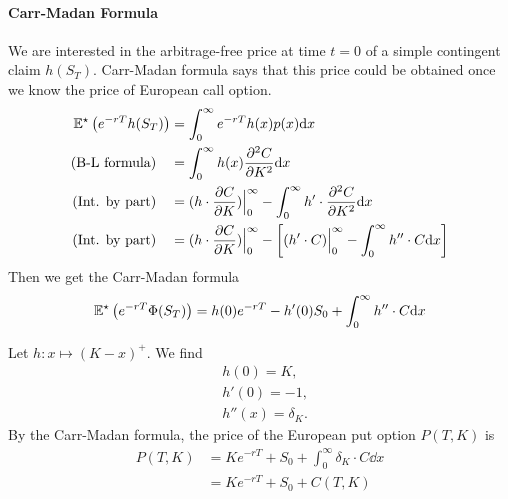 \paragraph{Carr-Madan Formula}  We are interested in the arbitrage-free price at time $t=0$ of a simple contingent claim $h(S_T)$. Carr-Madan formula says that this price could be obtained once we know the price of European call option.   
\begin{align*}
	\mathbb{E}^\star \left(  e^{-rT} h(S_T) \right) &= \int^\infty_0 e^{-rT} h(x) p(x) \mathrm{d} x \\
	(\text{B-L formula})\quad &= \int^\infty_0   h(x) \frac{\partial^2 C}{\partial K^2} \mathrm{d} x \\
	(\text{Int. by part})\quad &= ( h \cdot \frac{\partial C}{\partial K} )\Big|^\infty_0 - \int^\infty_0 h'\cdot \frac{\partial^2 C}{\partial K^2} \mathrm{d} x \\
	 (\text{Int. by part})\quad &=( h \cdot \frac{\partial C}{\partial K} )\Big|^\infty_0 - \left[ (h' \cdot C)\Big|^\infty_0  - \int^\infty_0 h''\cdot C \mathrm{d} x\right] \\
\end{align*}
Then we get the Carr-Madan formula
$$\mathbb{E}^\star \left(  e^{-rT} \Phi(S_T) \right) = h(0) e^{-rT} - h'(0) S_0 + \int^\infty_0 h''\cdot C \mathrm{d} x$$

\begin{example}
	Let $h: x \mapsto (K- x)^+$. We find
	\begin{align*}
		&h(0) = K, \\
		&h'(0) = -1, \\
		&h''(x) = \delta_K.
	\end{align*}
	By the Carr-Madan formula, the price of the European put option $P(T,K)$ is
	\begin{align*}
		P(T,K) &= Ke^{-rT} + S_0 +\int^\infty_0 \delta_K   \cdot C \dd x \\
		&= Ke^{-rT} + S_0 +  C(T, K)
	\end{align*}  
\end{example}
 

